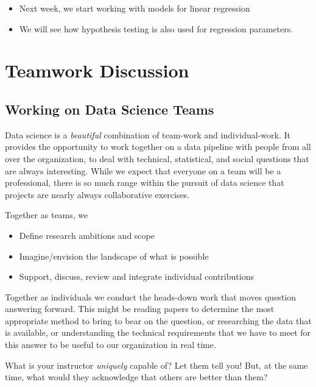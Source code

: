 \documentclass[
]{book}
\providecommand{\tightlist}{%
  \setlength{\itemsep}{0pt}\setlength{\parskip}{0pt}}
\theoremstyle{definition}
\theoremstyle{definition}
\theoremstyle{definition}
\theoremstyle{definition}
\theoremstyle{remark}
\begin{document}
\begin{itemize}
\tightlist
\item
  Next week, we start working with models for linear regression
\item
  We will see how hypothesis testing is also used for regression parameters.
\end{itemize}

\hypertarget{teamwork-discussion}{%
\section{Teamwork Discussion}\label{teamwork-discussion}}

\hypertarget{working-on-data-science-teams}{%
\subsection{Working on Data Science Teams}\label{working-on-data-science-teams}}

Data science is a \emph{beautiful} combination of team-work and individual-work. It provides the opportunity to work together on a data pipeline with people from all over the organization, to deal with technical, statistical, and social questions that are always interesting. While we expect that everyone on a team will be a professional, there is so much range within the pursuit of data science that projects are nearly always collaborative exercises.

Together as teams, we

\begin{itemize}
\tightlist
\item
  Define research ambitions and scope
\item
  Imagine/envision the landscape of what is possible
\item
  Support, discuss, review and integrate individual contributions
\end{itemize}

Together as individuals we conduct the heads-down work that moves question answering forward. This might be reading papers to determine the most appropriate method to bring to bear on the question, or researching the data that is available, or understanding the technical requirements that we have to meet for this answer to be useful to our organization in real time.

What is your instructor \emph{uniquely} capable of? Let them tell you! But, at the same time, what would they acknowledge that others are better than them?
\end{document}
